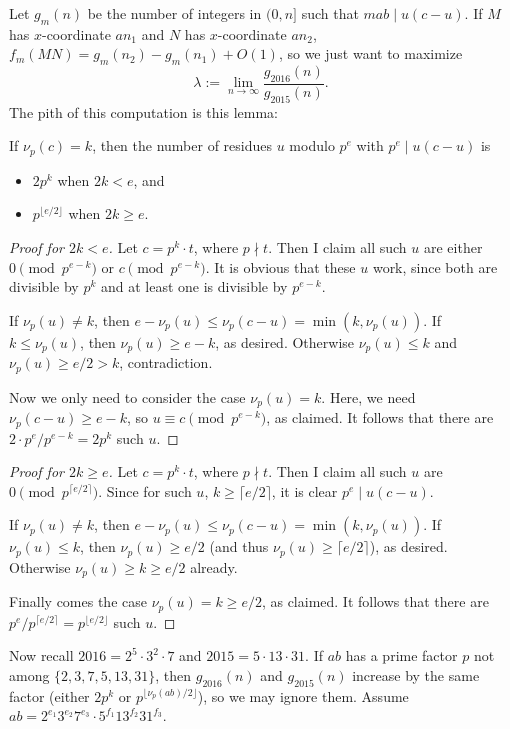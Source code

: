 Let $g_m(n)$ be the number of integers in $(0,n]$ such that $mab\mid u(c-u)$. If $M$ has $x$-coordinate $an_1$ and $N$ has $x$-coordinate $an_2$, $f_m(MN)=g_m(n_2)-g_m(n_1)+O(1)$, so we just want to maximize \[\lambda:=\lim_{n\to\infty}\frac{g_{2016}(n)}{g_{2015}(n)}.\]
The pith of this computation is this lemma:
\begin{boxlemma*}
    If $\nu_p(c)=k$, then the number of residues $u$ modulo $p^e$ with $p^e\mid u(c-u)$ is
    \begin{itemize}[itemsep=0em]
        \item $2p^k$ when $2k<e$, and
        \item $p^{\lfloor e/2\rfloor}$ when $2k\ge e$.
    \end{itemize}
\end{boxlemma*}
\begin{proof}[Proof for $2k<e$]
    Let $c=p^k\cdot t$, where $p\nmid t$. Then I claim all such $u$ are either $0\pmod{p^{e-k}}$ or $c\pmod{p^{e-k}}$. It is obvious that these $u$ work, since both are divisible by $p^k$ and at least one is divisible by $p^{e-k}$.

    If $\nu_p(u)\ne k$, then $e-\nu_p(u)\le\nu_p(c-u)=\min(k,\nu_p(u))$. If $k\le\nu_p(u)$, then $\nu_p(u)\ge e-k$, as desired. Otherwise $\nu_p(u)\le k$ and $\nu_p(u)\ge e/2>k$, contradiction.

    Now we only need to consider the case $\nu_p(u)=k$. Here, we need $\nu_p(c-u)\ge e-k$, so $u\equiv c\pmod{p^{e-k}}$, as claimed. It follows that there are $2\cdot p^e/p^{e-k}=2p^k$ such $u$.
\end{proof}
\begin{proof}[Proof for $2k\ge e$]
    Let $c=p^k\cdot t$, where $p\nmid t$. Then I claim all such $u$ are $0\pmod{p^{\lceil e/2\rceil}}$. Since for such $u$, $k\ge\lceil e/2\rceil$, it is clear $p^e\mid u(c-u)$.

    If $\nu_p(u)\ne k$, then $e-\nu_p(u)\le\nu_p(c-u)=\min(k,\nu_p(u))$. If $\nu_p(u)\le k$, then $\nu_p(u)\ge e/2$ (and thus $\nu_p(u)\ge\lceil e/2\rceil$), as desired. Otherwise $\nu_p(u)\ge k\ge e/2$ already.

    Finally comes the case $\nu_p(u)=k\ge e/2$, as claimed. It follows that there are $p^e/p^{\lceil e/2\rceil}=p^{\lfloor e/2\rfloor}$ such $u$.
\end{proof}

Now recall $2016=2^5\cdot3^2\cdot7$ and $2015=5\cdot13\cdot31$. If $ab$ has a prime factor $p$ not among $\{2,3,7,5,13,31\}$, then $g_{2016}(n)$ and $g_{2015}(n)$ increase by the same factor (either $2p^k$ or $p^{\lfloor\nu_p(ab)/2\rfloor}$), so we may ignore them. Assume $ab=2^{e_1}3^{e_2}7^{e_3}\cdot5^{f_1}13^{f_2}31^{f_3}$.

